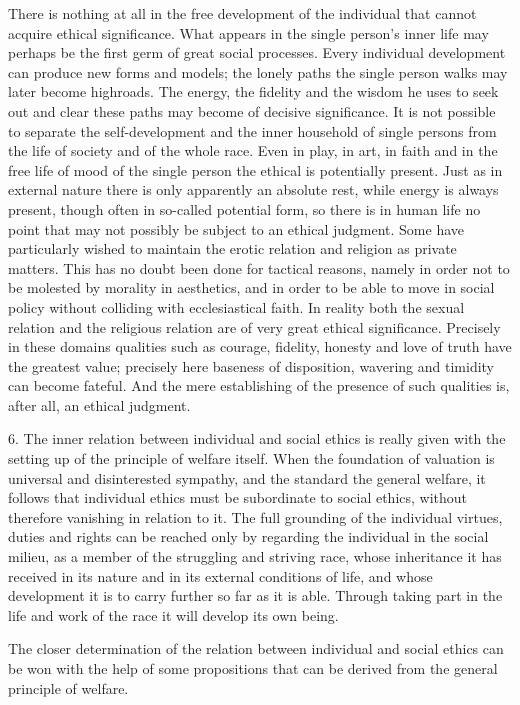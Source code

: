 \documentclass[12pt,a4paper,openany]{book}
\newcommand{\opage}[1]{\marginnote{\footnotesize\textit{[#1]}}}
\begin{document}
There is nothing at all in the free development of the individual that cannot acquire ethical significance.
What appears in the single person's inner life may perhaps be the first germ of great social processes. Every
individual development can produce new forms and models; the lonely paths the single person walks may later
become highroads. The energy, the fidelity and the wisdom he uses to seek out and clear these paths may become
of decisive significance. It is not possible to separate the self-development and the inner household of single
persons from the life of society and of the whole race. Even in play, in art, in faith and in the free life of
mood of the single person the ethical is potentially present. Just as in external nature there is only
apparently an absolute rest, while energy is always present, though often in so-called potential form, so there
is in human life no point that may not possibly
\opage{172}be subject to an ethical judgment. Some have particularly wished to maintain the erotic relation and
religion as private matters. This has no doubt been done for tactical reasons, namely in order not to be
molested by morality in aesthetics, and in order to be able to move in social policy without colliding with
ecclesiastical faith. In reality both the sexual relation and the religious relation are of very great ethical
significance. Precisely in these domains qualities such as courage, fidelity, honesty and love of truth have the
greatest value; precisely here baseness of disposition, wavering and timidity can become fateful. And the mere
establishing of the presence of such qualities is, after all, an ethical judgment.

6. The inner relation between individual and social ethics is really given with the setting up of the principle
of welfare itself. When the foundation of valuation is universal and disinterested sympathy, and the standard
the general welfare, it follows that individual ethics must be subordinate to social ethics, without therefore
vanishing in relation to it. The full grounding of the individual virtues, duties and rights can be reached only
by regarding the individual in the social milieu, as a member of the struggling and striving race, whose
inheritance it has received in its nature and in its external conditions of life, and whose development it is
to carry further so far as it is able. Through taking part in the life and work of the race it will develop its
own being.

The closer determination of the relation between individual and social ethics can be won with the help of some
propositions that can be derived from the general principle of welfare.
\end{document}
